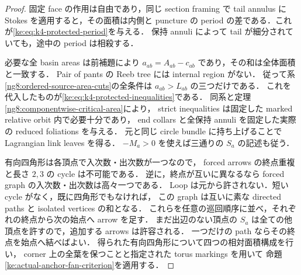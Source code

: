 \begin{proof}
固定 face の作用は自由であり，同じ section framing で
tail annulus に Stokes を適用すると，その面積は内側と puncture の
period の差である．これが\eqref{ke:eq:k4-protected-period}を与える．
保持 annuli によって tail が細分されていても，途中の period は相殺する．

必要な全 basin areas は前補題により
$a_{ab}=A_{ab}-c_{ab}$ であり，その和は全体面積と一致する．
Pair of pants の Reeb tree には internal region がない．
従って系\ref{ng8:ordered-source-area-cuts}の全条件は
$a_{ab}>L_{ab}$ の三つだけである．
これを代入したものが\eqref{ke:eq:k4-protected-inequalities}である．
同系と定理\ref{ng8:componentwise-critical-area}により，
strict inequalities は固定した marked relative orbit 内で必要十分であり，
end collars と全保持 annuli を固定した実際の reduced foliations を与える．
元と同じ circle bundle に持ち上げることで Lagrangian link leaves を得る．
$-M_a>0$ を使えば三通りの $S_a$ の記述も従う．

有向四角形は各頂点で入次数・出次数が一つなので，
forced arrows の終点重複と長さ $2,3$ の cycle は不可能である．
逆に，終点が互いに異なるなら forced graph の入次数・出次数は高々一つである．
Loop は元から許されない．短い cycle がなく，既に四角形でもなければ，
この graph は互いに素な directed paths と isolated vertices の和となる．
これらを任意の巡回順序に並べ，それぞれの終点から次の始点へ arrow を足す．
まだ出辺のない頂点の $S_a$ は全ての他頂点を許すので，追加する arrows は許容される．
一つだけの path ならその終点を始点へ結べばよい．
得られた有向四角形について四つの相対面積構成を行い，
corner 上の全葉を保つことと指定された torus markings を用いて
命題\ref{ke:actual-anchor-fan-criterion}を適用する．
\end{proof}


